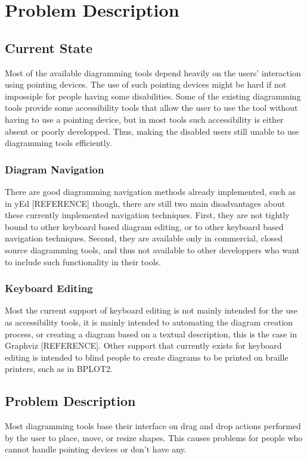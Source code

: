 \chapter{Problem Description}
\beginchapter

\section{Current State}
Most of the available diagramming tools depend heavily on the users' interaction using pointing devices. The use of such pointing devices might be hard if not impossiple for people having some disabilities. Some of the existing diagramming tools provide some accessibility tools that allow the user to use the tool without having to use a pointing device, but in most tools such accessibility is either absent or poorly developped. Thus, making the disabled users still unable to use diagramming tools efficiently.

\subsection{Diagram Navigation}
There are good diagramming navigation methods already implemented, such as in yEd [REFERENCE] though, there are still two main disadvantages about these currently implemented navigation techniques. First, they are not tightly bound to other keyboard based diagram editing, or to other keyboard based navigation techniques. Second, they are available only in commercial, closed source diagramming tools, and thus not available to other developpers who want to include such functionality in their tools.

\subsection{Keyboard Editing}
Most the current support of keyboard editing is not mainly intended for the use as accessibility tools, it is mainly intended to automating the diagram creation process, or creating a diagram based on a textual description, this is the case in Graphviz [REFERENCE]. Other support that currently exists for keyboard editing is intended to blind people to create diagrams to be printed on braille printers, such as in BPLOT2. \cite{bplot2}


\section{Problem Description}
Most diagramming tools base their interface on drag and drop actions performed by the user to place, move, or resize shapes. This causes problems for people who cannot handle pointing devices or don't have any.

